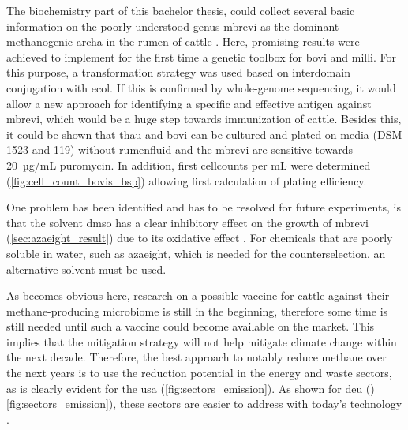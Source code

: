 The biochemistry part of this bachelor thesis, could collect several basic information on the poorly understood genus \acrlong{mbrevi} as the dominant methanogenic \gls{archa} in the rumen of cattle \parencite[p.\,3]{baca-gonzalezAreVaccinesSolution2020}. Here, promising results were achieved to implement for the first time a genetic toolbox for \acrshort{bovi} and \acrshort{milli}. For this purpose, a transformation strategy was used based on interdomain conjugation with \acrshort{ecol}. If this is confirmed by whole-genome sequencing, it would allow a new approach for identifying a specific and effective antigen against \acrlong{mbrevi}, which would be a huge step towards immunization of cattle. Besides this, it could be shown that \acrshort{thau} and \acrshort{bovi} can be cultured and plated on media (DSM 1523 and 119) without rumenfluid and the \acrlong{mbrevi} are sensitive towards 20~µg/mL puromycin. In addition, first cellcounts per mL were determined (\cref{fig:cell_count_bovis_bsp}) allowing first calculation of plating efficiency. 

One problem has been identified and has to be resolved for future experiments, is that the solvent \acrshort{dmso} has a clear inhibitory effect on the growth of \acrshort{mbrevi} (\cref{sec:azaeight_result}) due to its oxidative effect \parencite{atcherEffectDMSOAqueous2013}. For chemicals that are poorly soluble in water, such as \acrshort{azaeight}, which is needed for the \gls{counterselection}, an alternative solvent must be used. 

As becomes obvious here, research on a possible vaccine for cattle against their methane-producing microbiome is still in the beginning, therefore some time is still needed until such a vaccine could become available on the market. This implies that the mitigation strategy will not help mitigate climate change within the next decade.
Therefore, the best approach to notably reduce methane over the next years is to use the reduction potential in the energy and waste sectors, as is clearly evident for the \acrshort{usa} (\cref{fig:sectors_emission}). As shown for \acrshort{deu} ()\cref{fig:sectors_emission}), these sectors are easier to address with today's technology \parencite{appelhansUnterschatztesTreibhausgasMethan2025, ipccClimateChange20222022}.


